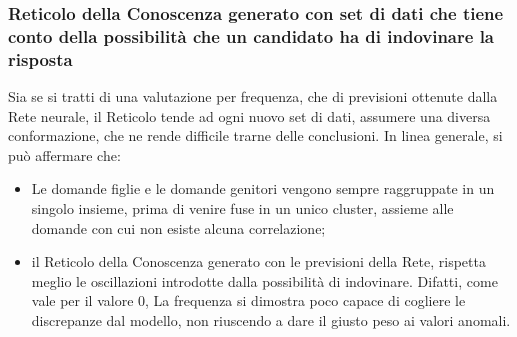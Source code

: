 \subsubsection{Reticolo della Conoscenza generato con set di dati che tiene conto della possibilit\`a che un candidato ha di indovinare la risposta}
\label{Reticolo della Conoscenza generato con set di dati che tiene conto della possibilita che un candidato ha di indovinare la risposta}
Sia se si tratti di una valutazione per frequenza, che di previsioni ottenute dalla Rete neurale, il Reticolo tende ad ogni nuovo set di dati, assumere una diversa conformazione, che ne rende difficile trarne delle conclusioni.
In linea generale, si pu\`o affermare che:
\begin{itemize}
\item Le domande figlie e le domande genitori vengono sempre raggruppate in un singolo insieme, prima di venire fuse in un unico cluster, assieme alle domande con cui non esiste alcuna correlazione;
\item il Reticolo della Conoscenza generato con le previsioni della Rete, rispetta meglio le oscillazioni introdotte dalla possibilit\`a di indovinare. Difatti, come vale per il valore 0, La frequenza si dimostra poco capace di cogliere le discrepanze dal modello, non riuscendo a dare il giusto peso ai valori anomali.
\end{itemize}

